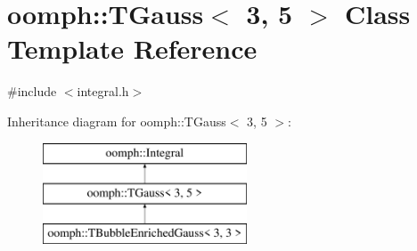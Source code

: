 \hypertarget{classoomph_1_1TGauss_3_013_00_015_01_4}{}\section{oomph\+:\+:T\+Gauss$<$ 3, 5 $>$ Class Template Reference}
\label{classoomph_1_1TGauss_3_013_00_015_01_4}


{\ttfamily \#include $<$integral.\+h$>$}

Inheritance diagram for oomph\+:\+:T\+Gauss$<$ 3, 5 $>$\+:\begin{figure}[H]
\begin{center}
\leavevmode
\includegraphics[height=3.000000cm]{classoomph_1_1TGauss_3_013_00_015_01_4}
\end{center}
\end{figure}
